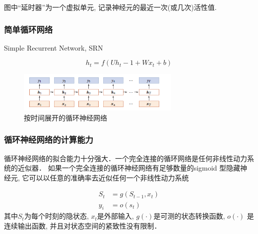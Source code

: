 \documentclass[a4paper]{article}
\begin{document}
图中“延时器”为一个虚拟单元, 记录神经元的最近一次(或几次)活性值.
\subsubsection{简单循环网络}
Simple Recurrent Network, SRN \citep{elman1990finding} 
 
$$h_t = f(Uh_t-1 +Wx_t + b)$$
\begin{figure}[!htb]
    \center
\includegraphics[width=0.7\textwidth]{simple_RNN.png}
\caption{按时间展开的循环神经网络}
\end{figure}


\subsubsection{循环神经网络的计算能力}
循环神经网络的拟合能力十分强大．一个完全连接的循环网络是任何非线性动力系统的近似器．
如果一个完全连接的循环神经网络有足够数量的sigmoid 型隐藏神经元, 它可以以任意的准确率去近似任何一个非线性动力系统

\begin{equation*}
    \begin{split}
        S_t &= g(S_{t-1}, x_t) \\
        y_i & = o(s_t)
    \end{split}
\end{equation*}
其中$S_t$为每个时刻的隐状态, $x_t$是外部输入, $g(\cdot)$是可测的状态转换函数, 
$o(\cdot)$ 是连续输出函数, 并且对状态空间的紧致性没有限制．
 
\end{document}
